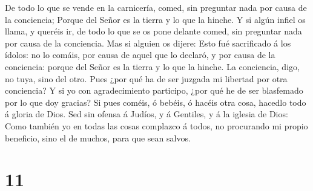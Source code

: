 De todo lo que se vende en la carnicería, comed, sin
preguntar nada por causa de la conciencia;  Porque del
Señor es la tierra y lo que la hinche.  Y si algún infiel
os llama, y queréis ir, de todo lo que se os pone delante comed, sin
preguntar nada por causa de la conciencia.  Mas si alguien
os dijere: Esto fué sacrificado á los ídolos: no lo comáis, por causa de
aquel que lo declaró, y por causa de la conciencia: porque del Señor es
la tierra y lo que la hinche.  La conciencia, digo, no
tuya, sino del otro. Pues ¿por qué ha de ser juzgada mi libertad por
otra conciencia?  Y si yo con agradecimiento participo,
¿por qué he de ser blasfemado por lo que doy gracias?  Si
pues coméis, ó bebéis, ó hacéis otra cosa, hacedlo todo á gloria de
Dios.  Sed sin ofensa á Judíos, y á Gentiles, y á la
iglesia de Dios:  Como también yo en todas las cosas
complazco á todos, no procurando mi propio beneficio, sino el de muchos,
para que sean salvos.

\hypertarget{section-10}{%
\section{11}\label{section-10}}

